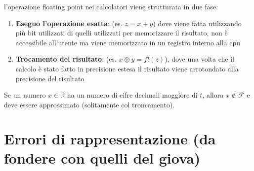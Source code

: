 l'operazione floating point nei calcolatori viene strutturata in due fase:
\begin{enumerate}
    \item \textbf{Eseguo l'operazione esatta}: (es. $z=x+y$) dove viene fatta utilizzando più bit utilizzati di quelli utilizzati per memorizzare il risultato, non è accessibile all'utente ma viene memorizzato in un registro interno alla cpu
    \item \textbf{Trocamento del risultato}: (es. $x\oplus y = fl(z)$), dove una volta che il calcolo è stato fatto in precisione estesa il risultato viene arrotondato alla precisione del risultato
\end{enumerate}

Se un numero $ x \in \mathbb{R} $ ha un numero di cifre decimali maggiore di $ t $, allora $ x \not\in \mathcal{F} $ e deve essere approssimato (solitamente col troncamento).

\section{Errori di rappresentazione (da fondere con quelli del giova)}

